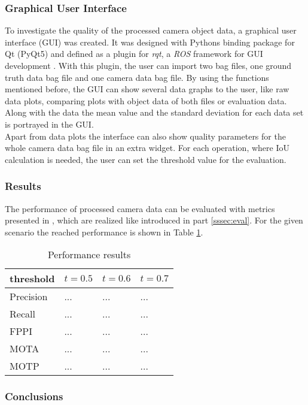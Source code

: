 \subsubsection{Graphical User Interface}
To investigate the quality of the processed camera object data, a graphical user interface (GUI) was created. It was designed with Pythons binding package for Qt (PyQt5) \cite{PyQt}
and defined as a plugin for \textit{rqt}, a \textit{ROS} framework for GUI development \cite{rqt}.
With this plugin, the user can import two bag files, one ground truth data bag file and one camera data bag file.
By using the functions mentioned before, the GUI can show several data graphs to the user, like raw data plots, comparing plots with object data of both files or evaluation data. 
Along with the data the mean value and the standard deviation for each data set is portrayed in the GUI. \\
Apart from data plots the interface can also show quality parameters for the whole camera data bag file in an extra widget. 
For each operation, where IoU calculation is needed, the user can set the threshold value for the evaluation. \\

\subsubsection{Results}
The performance of processed camera data can be evaluated with metrics presented in \cite{Reway}, which are realized like introduced in part \ref{sssec:eval}. For the given scenario the reached performance is shown in Table \ref{tab:res}.
		
\begin{table}[h]
	\caption{Performance results}
	\begin{tabularx}{\columnwidth}{XXXX}
		\toprule
		\textbf{threshold} & $t=0.5$ & $t=0.6$ & $t=0.7$ \\
		\toprule
		Precision & ... & ... & ... \\
		\midrule
		Recall & ... & ... & ... \\
		\midrule		
		FPPI & ... & ... & ... \\
		\midrule
		MOTA & ... & ... & ... \\
		\midrule
		MOTP & ... & ... & ... \\
		\bottomrule
	\end{tabularx}
	\label{tab:res}
\end{table}
		
\subsubsection{Conclusions}
	



 
